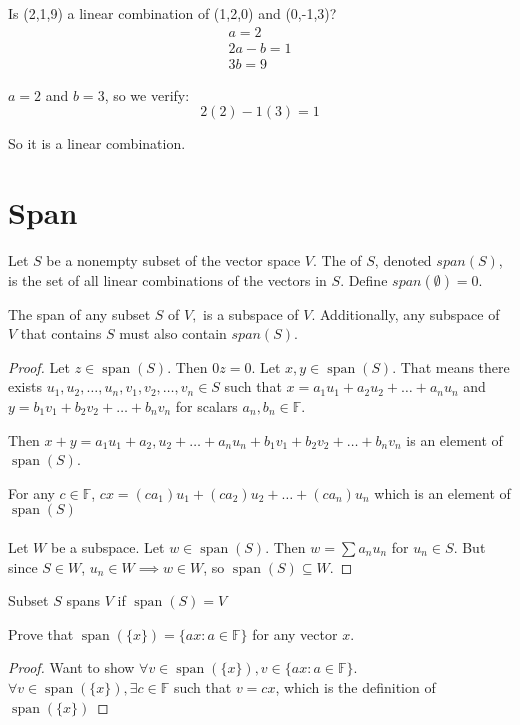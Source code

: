 \documentclass{article}
\begin{document}
\begin{example}[Vectors]
\end{example}

Is (2,1,9) a linear combination of (1,2,0) and (0,-1,3)?
\begin{align*}
    a = 2\\
    2a - b = 1\\
    3b = 9
\end{align*}

$a = 2$ and $b = 3$, so we verify:
\[
2(2) - 1(3) = 1
\]

So it is a linear combination.

\section{Span}
\begin{definition}
    Let $S$ be a nonempty subset of the vector space $V$. The  of $S$, denoted $span(S)$, is the set of all linear combinations of the vectors in $S$. Define $span(\emptyset) = 0$.
\end{definition}

\begin{theorem}
    The span of any subset $S$ of $V,$ is a subspace of $V$. Additionally, any subspace of $V$ that contains $S$ must also contain $span(S)$.
\end{theorem}

\begin{proof}
Let $z \in \operatorname{span}(S)$. Then $0z = 0$. Let $x,y \in \operatorname{span}(S)$. That means there exists $u_1, u_2, \dots, u_n, v_1, v_2, \dots, v_n \in S$ such that $x = a_1u_1 + a_2u_2 + \dots+a_nu_n$ and $y = b_1v_1 + b_2v_2+\dots+b_nv_n$ for scalars $a_n,b_n \in \mathbb{F}$.

Then $x + y = a_1u_1 + a_2,u_2 + \dots+a_nu_n + b_1v_1 + b_2v_2+\dots+b_nv_n$ is an element of $\operatorname{span}(S)$.

For any $c \in \mathbb{F}$, $cx = (ca_1)u_1 + (ca_2)u_2 + \dots+(ca_n)u_n$ which is an element of $\operatorname{span}(S)$
\\
\\
Let $W$ be a subspace. Let $w \in \operatorname{span}(S)$. Then $w = \sum a_nu_n$ for $u_n \in S$. But since $S \in W$, $u_n \in W \implies w \in W$, so $\operatorname{span}(S) \subseteq W$.

\end{proof}

\begin{definition}
    Subset $S$ spans $V$ if $\operatorname{span}(S) = V$
\end{definition}

Prove that $\operatorname{span}(\{x\}) = \{ax: a \in \mathbb{F}\}$ for any vector $x$.

\begin{proof}
    Want to show $\forall v \in \operatorname{span}(\{x\}), v \in \{ax: a \in \mathbb{F}\}$. $\forall v \in \operatorname{span}(\{x\}), \exists c \in \mathbb{F}$ such that $v = cx$, which is the definition of $\operatorname{span}(\{x\})$

\end{proof}
\end{document}
